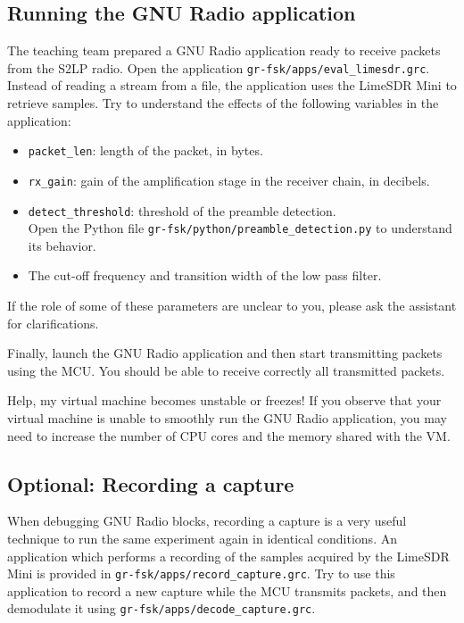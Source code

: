 \subsection{Running the GNU Radio application}

The teaching team prepared a GNU Radio application ready to receive packets from the S2LP radio.
Open the application \texttt{gr-fsk/apps/eval\_limesdr.grc}. Instead of reading a stream from a file, the application uses the LimeSDR Mini
to retrieve samples. Try to understand the effects of the following variables in the application:
\begin{itemize}
    \item \texttt{packet\_len}: length of the packet, in bytes.
    \item \texttt{rx\_gain}: gain of the amplification stage in the receiver chain, in decibels.
    \item \texttt{detect\_threshold}: threshold of the preamble detection. \\
    Open the Python file \texttt{gr-fsk/python/preamble\_detection.py} to understand its behavior.
    \item The cut-off frequency and transition width of the low pass filter.
\end{itemize}
If the role of some of these parameters are unclear to you, please ask the assistant for clarifications.

Finally, launch the GNU Radio application and then start transmitting packets using the MCU. You should be able to receive correctly all transmitted packets.
\begin{bclogo}[couleur = gray!20, arrondi = 0.2, logo=\bcinfo]{Help, my virtual machine becomes unstable or freezes!}
    If you observe that your virtual machine is unable to smoothly run the GNU Radio application, you may need to increase the number
    of CPU cores and the memory shared with the VM.
\end{bclogo}

\subsection{Optional: Recording a capture}

When debugging GNU Radio blocks, recording a capture is a very useful technique to run the same experiment again in identical conditions.
An application which performs a recording of the samples acquired by the LimeSDR Mini is provided in \texttt{gr-fsk/apps/record\_capture.grc}.
Try to use this application to record a new capture while the MCU transmits packets, and then demodulate it using \texttt{gr-fsk/apps/decode\_capture.grc}.

